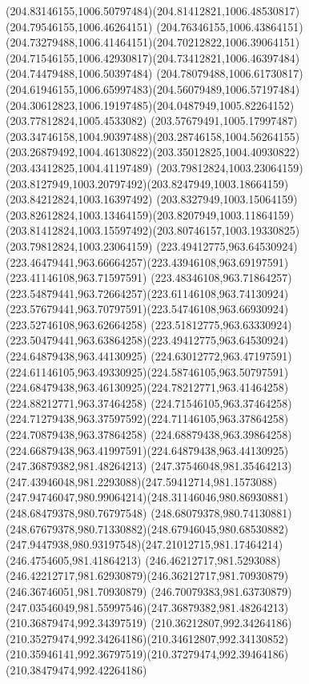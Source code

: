 {{		\curveto(204.83146155,1006.50797484)(204.81412821,1006.48530817)(204.79546155,1006.46264151)
		\curveto(204.76346155,1006.43864151)(204.73279488,1006.41464151)(204.70212822,1006.39064151)
		\curveto(204.71546155,1006.42930817)(204.73412821,1006.46397484)(204.74479488,1006.50397484)
		\curveto(204.78079488,1006.61730817)(204.61946155,1006.65997483)(204.56079489,1006.57197484)
		\curveto(204.30612823,1006.19197485)(204.0487949,1005.82264152)(203.77812824,1005.4533082)
		\curveto(203.57679491,1005.17997487)(203.34746158,1004.90397488)(203.28746158,1004.56264155)
		\curveto(203.26879492,1004.46130822)(203.35012825,1004.40930822)(203.43412825,1004.41197489)
		\moveto(203.79812824,1003.23064159)
		\curveto(203.8127949,1003.20797492)(203.8247949,1003.18664159)(203.84212824,1003.16397492)
		\curveto(203.8327949,1003.15064159)(203.82612824,1003.13464159)(203.8207949,1003.11864159)
		\curveto(203.81412824,1003.15597492)(203.80746157,1003.19330825)(203.79812824,1003.23064159)
		\moveto(223.49412775,963.64530924)
		\curveto(223.46479441,963.66664257)(223.43946108,963.69197591)(223.41146108,963.71597591)
		\curveto(223.48346108,963.71864257)(223.54879441,963.72664257)(223.61146108,963.74130924)
		\curveto(223.57679441,963.70797591)(223.54746108,963.66930924)(223.52746108,963.62664258)
		\curveto(223.51812775,963.63330924)(223.50479441,963.63864258)(223.49412775,963.64530924)
		\moveto(224.64879438,963.44130925)
		\curveto(224.63012772,963.47197591)(224.61146105,963.49330925)(224.58746105,963.50797591)
		\curveto(224.68479438,963.46130925)(224.78212771,963.41464258)(224.88212771,963.37464258)
		\lineto(224.71546105,963.37464258)
		\curveto(224.71279438,963.37597592)(224.71146105,963.37864258)(224.70879438,963.37864258)
		\curveto(224.68879438,963.39864258)(224.66879438,963.41997591)(224.64879438,963.44130925)
		\moveto(247.36879382,981.48264213)
		\curveto(247.37546048,981.35464213)(247.43946048,981.2293088)(247.59412714,981.1573088)
		\curveto(247.94746047,980.99064214)(248.31146046,980.86930881)(248.68479378,980.76797548)
		\curveto(248.68079378,980.74130881)(248.67679378,980.71330882)(248.67946045,980.68530882)
		\curveto(247.9447938,980.93197548)(247.21012715,981.17464214)(246.4754605,981.41864213)
		\curveto(246.46212717,981.5293088)(246.42212717,981.62930879)(246.36212717,981.70930879)
		\lineto(246.36746051,981.70930879)
		\curveto(246.70079383,981.63730879)(247.03546049,981.55997546)(247.36879382,981.48264213)
		\moveto(210.36879474,992.34397519)
		\curveto(210.36212807,992.34264186)(210.35279474,992.34264186)(210.34612807,992.34130852)
		\curveto(210.35946141,992.36797519)(210.37279474,992.39464186)(210.38479474,992.42264186)
}}
